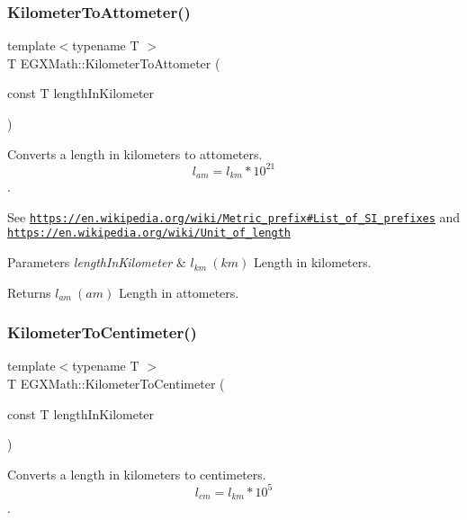 \subsubsection{\texorpdfstring{Kilometer\+To\+Attometer()}{KilometerToAttometer()}}
{\footnotesize\ttfamily template$<$typename T $>$ \\
T E\+G\+X\+Math\+::\+Kilometer\+To\+Attometer (\begin{DoxyParamCaption}\item[{const T}]{length\+In\+Kilometer }\end{DoxyParamCaption})}



Converts a length in kilometers to attometers. \[ l_{am}=l_{km} * 10^{21} \]. 

See \href{https://en.wikipedia.org/wiki/Metric_prefix#List_of_SI_prefixes}{\tt https\+://en.\+wikipedia.\+org/wiki/\+Metric\+\_\+prefix\#\+List\+\_\+of\+\_\+\+S\+I\+\_\+prefixes} and \href{https://en.wikipedia.org/wiki/Unit_of_length}{\tt https\+://en.\+wikipedia.\+org/wiki/\+Unit\+\_\+of\+\_\+length} 
\begin{DoxyParams}{Parameters}
{\em length\+In\+Kilometer} & $ l_{km}\ (km)$ Length in kilometers. \\
\hline
\end{DoxyParams}
\begin{DoxyReturn}{Returns}
$ l_{am}\ (am)$ Length in attometers. 
\end{DoxyReturn}
\mbox{\label{group___e_g_x_math-_conversions-_length_conversions-_kilometer-_s_i_ga1d5cac5eab11ffbf7b839180813343d0}} 
\subsubsection{\texorpdfstring{Kilometer\+To\+Centimeter()}{KilometerToCentimeter()}}
{\footnotesize\ttfamily template$<$typename T $>$ \\
T E\+G\+X\+Math\+::\+Kilometer\+To\+Centimeter (\begin{DoxyParamCaption}\item[{const T}]{length\+In\+Kilometer }\end{DoxyParamCaption})}



Converts a length in kilometers to centimeters. \[ l_{cm}=l_{km} * 10^{5} \]. 

